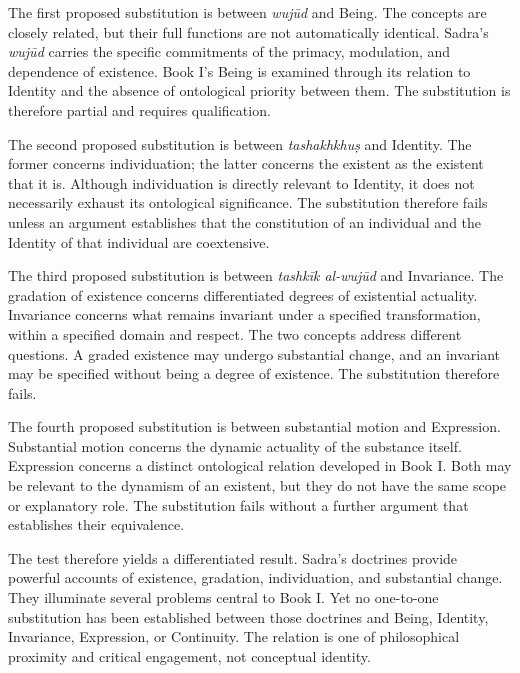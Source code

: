 The first proposed substitution
is between \textit{wujūd}
and Being. The concepts
are closely related,
but their full functions
are not automatically
identical. Sadra's
\textit{wujūd} carries
the specific commitments
of the primacy, modulation,
and dependence of
existence. Book I's
Being is examined
through its relation
to Identity and the
absence of ontological
priority between them.
The substitution is
therefore partial and
requires qualification.

\label{para:VS.B01.P01.C08.S17.SS17.P003}

The second proposed substitution
is between
\textit{tashakhkhuṣ}
and Identity. The former
concerns individuation;
the latter concerns
the existent as the
existent that it is.
Although individuation
is directly relevant
to Identity, it does
not necessarily exhaust
its ontological significance.
The substitution therefore
fails unless an argument
establishes that the
constitution of an
individual and the
Identity of that
individual are
coextensive.

\label{para:VS.B01.P01.C08.S17.SS17.P004}

The third proposed substitution
is between
\textit{tashkīk al-wujūd}
and Invariance. The
gradation of existence
concerns differentiated
degrees of existential
actuality. Invariance
concerns what remains
invariant under a
specified transformation,
within a specified
domain and respect.
The two concepts
address different
questions. A graded
existence may undergo
substantial change,
and an invariant
may be specified
without being a
degree of existence.
The substitution
therefore fails.

\label{para:VS.B01.P01.C08.S17.SS17.P005}

The fourth proposed substitution
is between substantial
motion and Expression.
Substantial motion
concerns the dynamic
actuality of the
substance itself.
Expression concerns
a distinct ontological
relation developed
in Book I. Both may
be relevant to the
dynamism of an existent,
but they do not
have the same scope
or explanatory role.
The substitution
fails without a
further argument
that establishes
their equivalence.

\label{para:VS.B01.P01.C08.S17.SS17.P006}

The test therefore yields
a differentiated result.
Sadra's doctrines provide
powerful accounts of
existence, gradation,
individuation, and
substantial change.
They illuminate several
problems central to
Book I. Yet no
one-to-one substitution
has been established
between those doctrines
and Being, Identity,
Invariance, Expression,
or Continuity. The
relation is one of
philosophical proximity
and critical engagement,
not conceptual identity.

